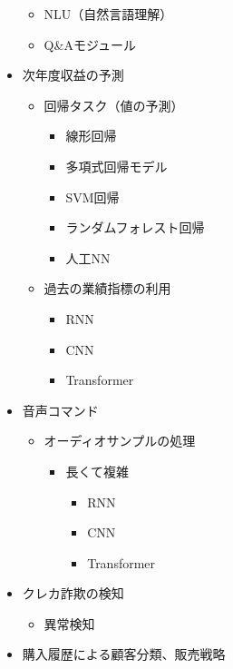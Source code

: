 \begin{itemize}
  \begin{itemize}
  \tightlist
  \item
    NLU（自然言語理解）
  \item
    Q\&Aモジュール
  \end{itemize}
\item
  次年度収益の予測

  \begin{itemize}
  \tightlist
  \item
    回帰タスク（値の予測）

    \begin{itemize}
    \tightlist
    \item
      線形回帰
    \item
      多項式回帰モデル
    \item
      SVM回帰
    \item
      ランダムフォレスト回帰
    \item
      人工NN
    \end{itemize}
  \item
    過去の業績指標の利用

    \begin{itemize}
    \tightlist
    \item
      RNN
    \item
      CNN
    \item
      Transformer
    \end{itemize}
  \end{itemize}
\item
  音声コマンド

  \begin{itemize}
  \tightlist
  \item
    オーディオサンプルの処理

    \begin{itemize}
    \tightlist
    \item
      長くて複雑

      \begin{itemize}
      \tightlist
      \item
        RNN
      \item
        CNN
      \item
        Transformer
      \end{itemize}
    \end{itemize}
  \end{itemize}
\item
  クレカ詐欺の検知

  \begin{itemize}
  \tightlist
  \item
    異常検知
  \end{itemize}
\item
  購入履歴による顧客分類、販売戦略


\end{itemize}
